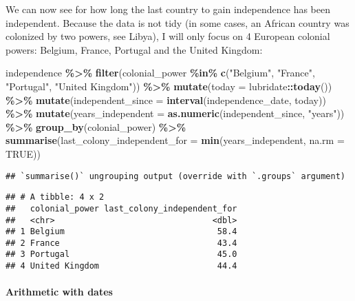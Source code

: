 \documentclass[
]{article}
\newenvironment{Shaded}{\begin{snugshade}}{\end{snugshade}}
\newcommand{\DataTypeTok}[1]{\textcolor[rgb]{0.13,0.29,0.53}{#1}}
\newcommand{\KeywordTok}[1]{\textcolor[rgb]{0.13,0.29,0.53}{\textbf{#1}}}
\newcommand{\NormalTok}[1]{#1}
\newcommand{\OperatorTok}[1]{\textcolor[rgb]{0.81,0.36,0.00}{\textbf{#1}}}
\newcommand{\OtherTok}[1]{\textcolor[rgb]{0.56,0.35,0.01}{#1}}
\newcommand{\StringTok}[1]{\textcolor[rgb]{0.31,0.60,0.02}{#1}}
\begin{document}
We can now see for how long the last country to gain independence has been independent.
Because the data is not tidy (in some cases, an African country was colonized by two powers,
see Libya), I will only focus on 4 European colonial powers: Belgium, France, Portugal and the United Kingdom:

\begin{Shaded}
\begin{Highlighting}[]
\NormalTok{independence }\OperatorTok{\%\textgreater{}\%}
\StringTok{  }\KeywordTok{filter}\NormalTok{(colonial\_power }\OperatorTok{\%in\%}\StringTok{ }\KeywordTok{c}\NormalTok{(}\StringTok{"Belgium"}\NormalTok{, }\StringTok{"France"}\NormalTok{, }\StringTok{"Portugal"}\NormalTok{, }\StringTok{"United Kingdom"}\NormalTok{)) }\OperatorTok{\%\textgreater{}\%}
\StringTok{  }\KeywordTok{mutate}\NormalTok{(}\DataTypeTok{today =}\NormalTok{ lubridate}\OperatorTok{::}\KeywordTok{today}\NormalTok{()) }\OperatorTok{\%\textgreater{}\%}
\StringTok{  }\KeywordTok{mutate}\NormalTok{(}\DataTypeTok{independent\_since =} \KeywordTok{interval}\NormalTok{(independence\_date, today)) }\OperatorTok{\%\textgreater{}\%}
\StringTok{  }\KeywordTok{mutate}\NormalTok{(}\DataTypeTok{years\_independent =} \KeywordTok{as.numeric}\NormalTok{(independent\_since, }\StringTok{"years"}\NormalTok{)) }\OperatorTok{\%\textgreater{}\%}
\StringTok{  }\KeywordTok{group\_by}\NormalTok{(colonial\_power) }\OperatorTok{\%\textgreater{}\%}
\StringTok{  }\KeywordTok{summarise}\NormalTok{(}\DataTypeTok{last\_colony\_independent\_for =} \KeywordTok{min}\NormalTok{(years\_independent, }\DataTypeTok{na.rm =} \OtherTok{TRUE}\NormalTok{))}
\end{Highlighting}
\end{Shaded}

\begin{verbatim}
## `summarise()` ungrouping output (override with `.groups` argument)
\end{verbatim}

\begin{verbatim}
## # A tibble: 4 x 2
##   colonial_power last_colony_independent_for
##   <chr>                                <dbl>
## 1 Belgium                               58.4
## 2 France                                43.4
## 3 Portugal                              45.0
## 4 United Kingdom                        44.4
\end{verbatim}

\hypertarget{arithmetic-with-dates}{%
\paragraph{Arithmetic with dates}\label{arithmetic-with-dates}}
\end{document}
